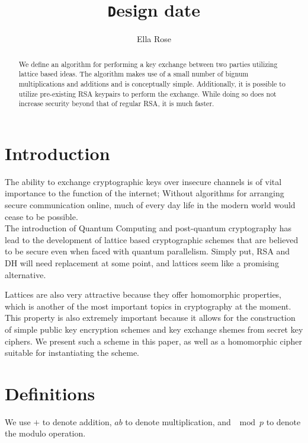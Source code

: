 \documentclass[preprint]{iacrtrans}
\author{Ella Rose\inst{1}}
\institute{Paso Robles, CA \email{address@provider.com}}
\title[\texttt Design date]{\texttt Design date}
\begin{document}
\maketitle


\begin{abstract}
  We define an algorithm for performing a key exchange between two parties utilizing lattice based ideas. The algorithm makes use of a small number of bignum multiplications and additions and is conceptually simple. Additionally, it is possible to utilize pre-existing RSA keypairs to perform the exchange. While doing so does not increase security beyond that of regular RSA, it is much faster.\\ 
\end{abstract}

\todototoc
\listoftodos

\section{Introduction}
 The ability to exchange cryptographic keys over insecure channels is of vital importance to the function of the internet; Without algorithms for arranging secure communication online, much of every day life in the modern world would cease to be possible.\\

The introduction of Quantum Computing and post-quantum cryptography has lead to the development of lattice based cryptographic schemes that are believed to be secure even when faced with quantum parallelism. Simply put, RSA and DH will need replacement at some point, and lattices seem like a promising alternative.

Lattices are also very attractive because they offer homomorphic properties, which is another of the most important topics in cryptography at the moment. This property is also extremely important because it allows for the construction of simple public key encryption schemes and key exchange shemes from secret key ciphers. We present such a scheme in this paper, as well as a homomorphic cipher suitable for instantiating the scheme.

\section{Definitions}
We use $+$ to denote addition, $ab$ to denote multiplication, and $\mod p$ to denote the modulo operation.
\end{document}
